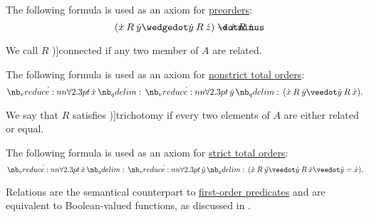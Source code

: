 \begin{definition}
\begin{thmenum}[resume=def:binary_relation]
    The following formula is used as an axiom for \hyperref[def:partially_ordered_set]{preorders}:
    \begin{equation}\label{eq:def:binary_relation/transitive}
      (\synx \mathbin{R} \syny \synwedge \syny \mathbin{R} \synz) \synimplies \synx \mathbin{R} \synz.
    \end{equation}

     We call \( R \) \term[ru=полное (отношение) (\cite[def. 2.7]{Гуров2013})]{connected} if any two member of \( A \) are related.

    The following formula is used as an axiom for \hyperref[def:totally_ordered_set]{nonstrict total orders}:
    \begin{equation}\label{eq:def:binary_relation/connected}
      \qforall \synx \qforall \syny (\synx \mathbin{R} \syny \synvee \syny \mathbin{R} \synx).
    \end{equation}

     We say that \( R \) satisfies \term[bg=трихотомия (\cite[11]{Тагамлицки1971Диф})]{trichotomy} if every two elements of \( A \) are either related or equal.

    The following formula is used as an axiom for \hyperref[def:totally_ordered_set]{strict total orders}:
    \begin{equation}\label{eq:def:binary_relation/trichotomy}
      \qforall \synx \qforall \syny (\synx \mathbin{R} \syny \synvee \syny \mathbin{R} \synx \synvee \syny = \synx).
    \end{equation}
  \end{thmenum}
\end{definition}
\begin{comments}
  \item Relations are the semantical counterpart to \hyperref[def:first_order_structure/interpretation/predicate]{first-order predicates} and are equivalent to Boolean-valued functions, as discussed in .
\end{comments}

